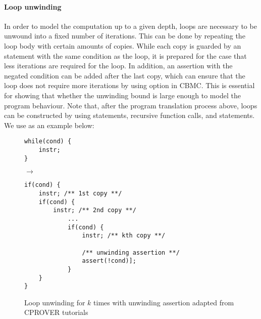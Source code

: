 \paragraph{Loop unwinding} \label{unwinding} In order to model the computation up to a given depth, loops are necessary to be unwound into a fixed number of iterations. This can be done by repeating the loop body with certain amounts of copies. While each copy is guarded by an  statement with the same condition as the loop, it is prepared for the case that less iterations are required for the loop. In addition, an assertion with the negated condition can be added after the last copy, which can ensure that the loop does not require more iterations by using  option in CBMC. This
is essential for showing that whether the unwinding bound is large enough to model the program behaviour. Note that, after the program translation process above, loops can be constructed by using  statements, recursive function calls, and  statements. We use  as an example below: 


\begin{figure}[H]
\centering
{
\begin{minipage}{.2\textwidth}
\begin{verbatim}
while(cond) {
    instr;
}    
\end{verbatim}
\end{minipage}
\begin{minipage}[]{.05\textwidth}
$\to$
\end{minipage}
\begin{minipage}[]{.5\textwidth}
\begin{verbatim}
if(cond) {
    instr; /** 1st copy **/
    if(cond) {
        instr; /** 2nd copy **/
            ...
            if(cond) {
                instr; /** kth copy **/
                
                /** unwinding assertion **/
                assert(!cond)]; 
            }
    }
}    
\end{verbatim}
\end{minipage}
}
\caption{Loop unwinding for $k$ times with unwinding assertion adapted from CPROVER tutorials \protect\footnotemark}
\end{figure}

